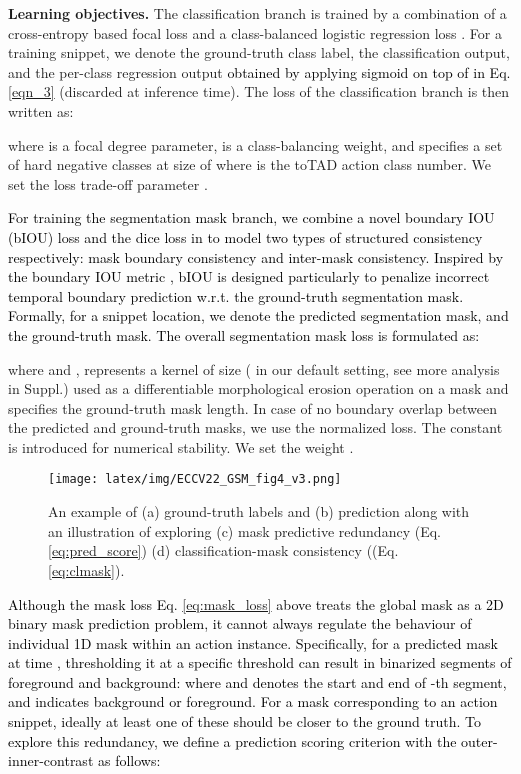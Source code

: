 \documentclass[runningheads]{llncs}
\begin{document}
\noindent\textbf{Learning objectives. } 
The classification branch is trained by a combination of a cross-entropy based focal loss and a class-balanced logistic regression loss \cite{dong2019single}. 
For a training snippet, we denote  the ground-truth class label,  the classification output,
and \textcolor{black}{} the per-class regression output \textcolor{black}{obtained by applying sigmoid on top of  in Eq. \eqref{eqn_3}} (discarded at inference time).
The loss of the classification branch is then written as:

where  is a focal degree parameter,
 is a class-balancing weight,
and  specifies a set of hard negative classes
at size of  where  is the toTAD action class number.
We set the loss trade-off parameter . 

\textcolor{black}{For training the segmentation mask branch, we combine a novel boundary IOU (bIOU) loss and the dice loss in \cite{milletari2016v} to model two types of structured consistency respectively: mask boundary consistency and inter-mask consistency. Inspired by the boundary IOU metric \cite{cheng2021boundary},
bIOU is designed particularly to penalize incorrect temporal boundary prediction w.r.t. the ground-truth segmentation mask.
Formally, for a snippet location, 
we denote  the predicted segmentation mask, and
 the ground-truth mask.
The overall segmentation mask loss is formulated as:
} 

where  and ,  represents a kernel of size  ( in our default setting, see more analysis in Suppl.) used as a differentiable morphological erosion operation \cite{riba2020kornia} on a mask and  specifies the ground-truth mask length.
In case of no boundary overlap between the predicted and ground-truth masks, 
we use the normalized  loss.
The constant  is introduced for numerical stability.
We set the weight .

 \begin{figure}[t]
\centering
\texttt{[image: latex/img/ECCV22\_GSM\_fig4\_v3.png]}
\caption{\color{black}
An example of (a) ground-truth labels and (b) prediction along with an illustration of exploring (c) mask predictive redundancy (Eq. \eqref{eq:pred_score}) (d) classification-mask consistency ((Eq. \eqref{eq:clmask}).
}
\label{fig:toy_ex}
\end{figure}

\textcolor{black}{Although the mask loss Eq. \eqref{eq:mask_loss} above treats the global mask as a 2D binary mask prediction problem, 
it cannot always regulate the behaviour of individual 1D mask within an action instance.}
\textcolor{black}{
Specifically, for a predicted mask  at time ,
thresholding it at a specific threshold 
can result in {binarized segments of foreground and background}:
 where  and  denotes the start and end of -th segment, and  indicates background or foreground. 
{For a mask corresponding to an action snippet, ideally  at least one of these  should be closer to the ground truth.}
To explore this redundancy, we define a prediction scoring criterion
with the outer-inner-contrast \cite{shou2018autoloc,lee2021learning} as follows:
}
\end{document}

